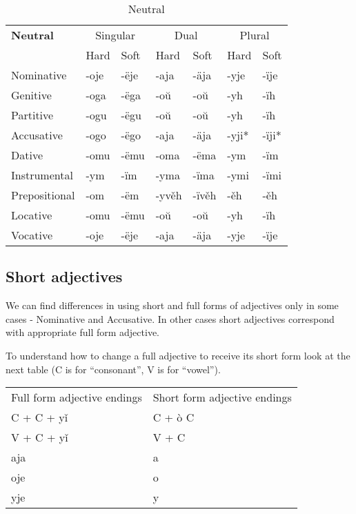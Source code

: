\begin{table}
	\caption{Neutral}
	\begin{tabular}{lllllll}
		\textbf{Neutral}       
		& \multicolumn{2}{c}{Singular} 
		& \multicolumn{2}{c}{Dual} 
		& \multicolumn{2}{c}{Plural} \\
		& Hard   & Soft  & Hard   & Soft   & Hard  & Soft \\
		Nominative    & -oje & -ëje     
		& -aja  & -äja        
		& -yje & -ïje \\
		Genitive      & -oga & -ëga 
		& -oŭ & -oŭ
		& -yh & -ïh \\
		Partitive     & -ogu & -ëgu 
		& -oŭ & -oŭ
		& -yh & -ïh \\
		Accusative    & -ogo & -ëgo     
		& -aja & -äja
		& -yji* & -ïji*  \\
		Dative		  & -omu & -ëmu
		& -oma & -ëma 
		& -ym & -ïm \\  
		Instrumental  & -ym & -ïm     
		& -yma & -ïma   
		& -ymi & -ïmi \\
		Prepositional & -om & -ëm  
		& -yvěh & -ïvěh     
		& -ěh & -ěh \\
		Locative      & -omu & -ëmu      
		& -oŭ & -oŭ
		& -yh & -ïh \\
		Vocative       & -oje & -ëje     
		& -aja  & -äja        
		& -yje & -ïje 
	\end{tabular}
\end{table}

\subsection{Short adjectives}

We can find differences in using short and full forms of adjectives only in some cases - Nominative and Accusative. In other cases short adjectives correspond with appropriate full form adjective.

To understand how to change a full adjective to receive its short form look at the next table (C is for “consonant”, V is for “vowel”).

\begin{table}
	\begin{tabular}{ll}
		Full form adjective endings & Short form adjective endings \\
		C + C + yǐ & C + ò C \\
	    V + C + yǐ & V + C \\
		aja & a \\
		oje  & o \\
		yje & y \\
	\end{tabular}
\end{table}

